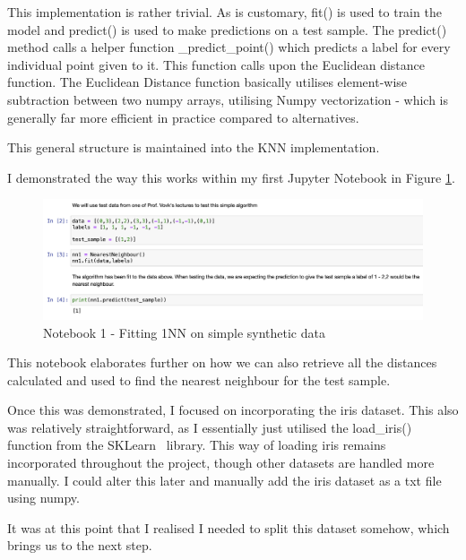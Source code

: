 \documentclass[letterpaper,10pt]{article}
\begin{document}
This implementation is rather trivial. As is customary, fit() is used to train the model and predict() is used to make predictions on a test sample. The predict() method calls a helper function \_predict\_point() which predicts a label for every individual point given to it. This function calls upon the Euclidean distance function. The Euclidean Distance function basically utilises element-wise subtraction between two numpy arrays, utilising Numpy vectorization - which is generally far more efficient in practice compared to alternatives.\par 
This general structure is maintained into the KNN implementation. \par

\vspace{5pt}

I demonstrated the way this works within my first Jupyter Notebook in Figure \ref{fig:1nnjupy}. 
\begin{figure}[htbp]
    \centering
    \includegraphics[width=1.25\textwidth]{1NNjupy.png}
    \caption{Notebook 1 - Fitting 1NN on simple synthetic data}
    \label{fig:1nnjupy}
\end{figure}

This notebook elaborates further on how we can also retrieve all the distances calculated and used to find the nearest neighbour for the test sample. \par

Once this was demonstrated, I focused on incorporating the iris\cite{irisdata} dataset. This also was relatively straightforward, as I essentially just utilised the load\_iris() function from the SKLearn~\cite{scikit-learn} library. This way of loading iris remains incorporated throughout the project, though other datasets are handled more manually. I could alter this later and manually add the iris dataset as a txt file using numpy\cite{numpy}. \par
It was at this point that I realised I needed to split this dataset somehow, which brings us to the next step. \par
\vspace{20pt}
\end{document}
